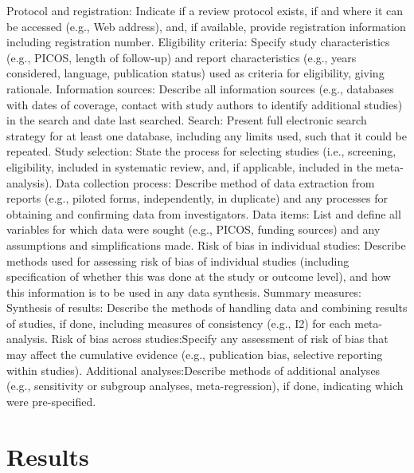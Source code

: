 \documentclass{article}\usepackage[]{graphicx}\usepackage[]{color}
\begin{document}
                Protocol and registration: Indicate if a review protocol exists, if and where it can be accessed (e.g., Web address), and, if available, provide registration information including registration number.
                Eligibility criteria: Specify study characteristics (e.g., PICOS, length of follow-up) and report characteristics (e.g., years considered, language, publication status) used as criteria for eligibility, giving rationale.
                Information sources: Describe all information sources (e.g., databases with dates of coverage, contact with study authors to identify additional studies) in the search and date last searched.
                Search: Present full electronic search strategy for at least one database, including any limits used, such that it could be repeated.
                Study selection: State the process for selecting studies (i.e., screening, eligibility, included in systematic review, and, if applicable, included in the meta-analysis).
                Data collection process: Describe method of data extraction from reports (e.g., piloted forms, independently, in duplicate) and any processes for obtaining and confirming data from investigators.
                Data items: List and define all variables for which data were sought (e.g., PICOS, funding sources) and any assumptions and simplifications made.
                Risk of bias in individual studies: Describe methods used for assessing risk of bias of individual studies (including specification of whether this was done at the study or outcome level), and how this information is to be used in any data synthesis.
                Summary measures:
                Synthesis of results: Describe the methods of handling data and combining results of studies, if done, including measures of consistency (e.g., I2) for each meta-analysis.
                Risk of bias across studies:Specify any assessment of risk of bias that may affect the cumulative evidence (e.g., publication bias, selective reporting within studies).
                Additional analyses:Describe methods of additional analyses (e.g., sensitivity or subgroup analyses, meta-regression), if done, indicating which were pre-specified.
                

\section{Results}
\end{document}
